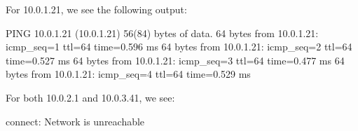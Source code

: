 For 10.0.1.21, we see the following output:

PING 10.0.1.21 (10.0.1.21) 56(84) bytes of data.
64 bytes from 10.0.1.21: icmp_seq=1 ttl=64 time=0.596 ms
64 bytes from 10.0.1.21: icmp_seq=2 ttl=64 time=0.527 ms
64 bytes from 10.0.1.21: icmp_seq=3 ttl=64 time=0.477 ms
64 bytes from 10.0.1.21: icmp_seq=4 ttl=64 time=0.529 ms

For both 10.0.2.1 and 10.0.3.41, we see:

connect: Network is unreachable
